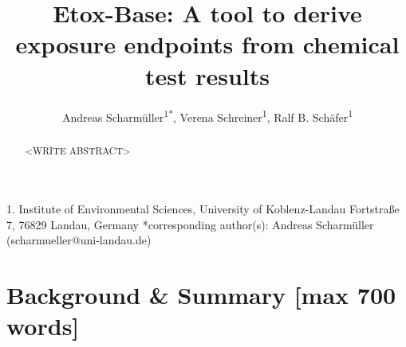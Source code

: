 \documentclass[english]{article}
\begin{document}
\title{Etox-Base: A tool to derive exposure endpoints from chemical test results}

\author{Andreas Scharm{\"u}ller\textsuperscript{1{*}},
        Verena Schreiner\textsuperscript{1},
        Ralf B. Sch{\"a}fer\textsuperscript{1}}

\maketitle
\thispagestyle{fancy}

1. Institute of Environmental Sciences, University of Koblenz-Landau Fortstraße 7, 76829 Landau, Germany {*}corresponding author(s):
Andreas Scharm{\"u}ller (scharmueller@uni-landau.de)

\begin{abstract}

<WRITE ABSTRACT>

\end{abstract}

\section*{Background \& Summary [max 700 words]}
\end{document}
